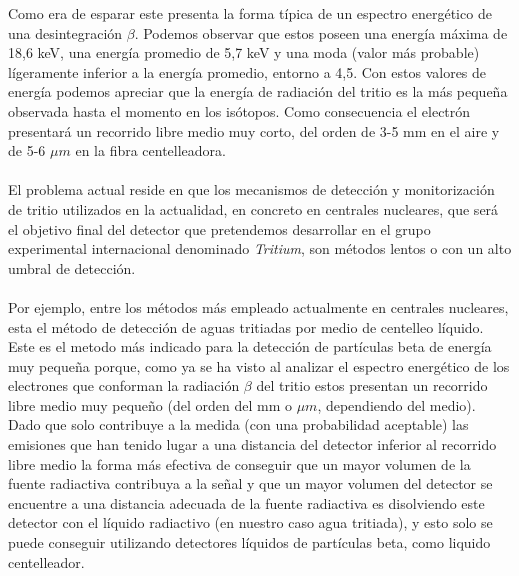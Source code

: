 Como era de esparar este presenta la forma típica de un espectro energético de una desintegración $\beta$. Podemos observar que estos poseen una energía máxima de 18,6 keV, una energía promedio de 5,7 keV y una moda (valor más probable) lígeramente inferior a la energía promedio, entorno a 4,5. Con estos valores de energía podemos apreciar que la energía de radiación del tritio es la más pequeña observada hasta el momento en los isótopos. Como consecuencia el electrón presentará un recorrido libre medio muy corto, del orden de 3-5 mm en el aire y de 5-6 $\mu m$ en la fibra centelleadora.

\paragraph {}
El problema actual reside en que los mecanismos de detección y monitorización de tritio utilizados en la actualidad, en concreto en centrales nucleares, que será el objetivo final del detector que pretendemos desarrollar en el grupo experimental internacional denominado \textit{Tritium}, son métodos lentos o con un alto umbral de detección. 

\paragraph {}
Por ejemplo, entre los métodos más empleado actualmente en centrales nucleares, esta el método de detección de aguas tritiadas por medio de centelleo líquido. Este es el metodo más indicado para la detección de partículas beta de energía muy pequeña porque, como ya se ha visto al analizar el espectro energético de los electrones que conforman la radiación $\beta$ del tritio estos presentan un recorrido libre medio muy pequeño (del orden del mm o $\mu m$, dependiendo del medio). Dado que solo contribuye a la medida (con una probabilidad aceptable) las emisiones que han tenido lugar a una distancia del detector inferior al recorrido libre medio la forma más efectiva de conseguir que un mayor volumen de la fuente radiactiva contribuya a la señal y que un mayor volumen del detector se encuentre a una distancia adecuada de la fuente radiactiva es disolviendo este detector con el líquido radiactivo (en nuestro caso agua tritiada), y esto solo se puede conseguir utilizando detectores líquidos de partículas beta, como liquido centelleador. 

